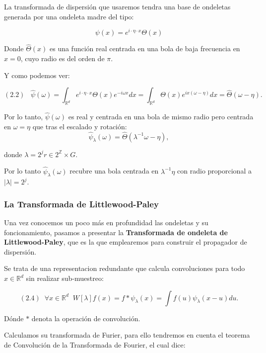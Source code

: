 \noindent La transformada de dispersión que usaremos tendra una base de ondeletas generada por una ondeleta madre del tipo:

$$\psi(x)=e^{i\cdot \eta \cdot  x} \Theta(x)$$

\noindent Donde $\widehat{\Theta}(x)$ es una función real centrada en una bola de baja frecuencia en $x=0$, cuyo radio es del orden de $\pi$.

\medskip

\noindent Y como podemos ver:

$$(2.2) \;\;\; \widehat{\psi}(\omega)=\int_{\mathbb{R}^d}e^{i\cdot \eta \cdot  x} \Theta(x) e^{-i\omega x} dx=\int_{\mathbb{R}^d}\Theta(x) e^{ix(\omega-\eta)} dx=\widehat{\Theta}(\omega-\eta).$$

\medskip

\noindent Por lo tanto, $\widehat{\psi}(\omega)$ es real y centrada en una bola de mismo radio pero centrada en $\omega=\eta$ que tras el escalado y rotación: 
$$\widehat{\psi}_\lambda(\omega)= \widehat{\Theta} (\lambda^{-1}\omega-\eta),$$ 

\noindent donde $\lambda=2^jr \in 2^{\mathbb{Z}}\times G$. 

\noindent Por lo tanto $\widehat{\psi}_\lambda(\omega)$ recubre una bola centrada en $\lambda^{-1}\eta$ con radio proporcional a $|\lambda|=2^j$.
 
\medskip 

\subsubsection{La Transformada de Littlewood-Paley}

\noindent Una vez conocemos un poco más en profundidad las ondeletas y su foncionamiento, pasamos a presentar la \textbf{Transformada de ondeleta de Littlewood-Paley}, que es la que emplearemos para construir el propagador de dispersión.

\noindent Se trata de una representacion redundante que calcula convoluciones para todo $x \in \mathbb{R}^d$ sin realizar sub-muestreo: 

$$(2.4) \; \; \forall x \in  \mathbb{R}^d \;\; W[\lambda]f(x)= f \ast \psi_\lambda(x)=\int f(u)\psi_\lambda(x-u) du .$$

\noindent Dónde $\ast$ denota la operación de convolución. 

\medskip

\noindent Calculamos su transformada de Furier, para ello tendremos en cuenta el teorema de Convolución de la Transformada de Fourier, el cual dice: 

